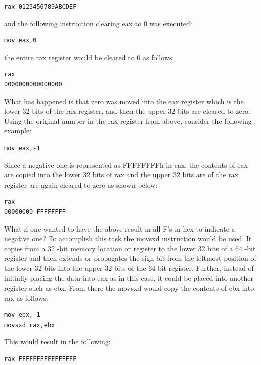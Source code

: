 \documentclass[10pt]{book}
\begin{document}
\begin{verbatim}
rax 0123456789ABCDEF
\end{verbatim}

and the following instruction clearing eax to 0 was executed:

\begin{verbatim}
mov eax,0
\end{verbatim}

the entire rax register would be cleared to 0 as follows:

\begin{verbatim}
rax
0000000000000000
\end{verbatim}

What has happened is that zero was moved into the eax register which is the lower 32 bits of the rax register, and then the upper 32 bits are cleared to zero. Using the original number in the rax register from above, consider the following example:

\begin{verbatim}
mov eax,-1
\end{verbatim}

Since a negative one is represented as FFFFFFFFh in eax, the contents of eax are copied into the lower 32 bits of rax and the upper 32 bits are of the rax register are again cleared to zero as shown below:

\begin{verbatim}
rax
00000000 FFFFFFFF
\end{verbatim}

What if one wanted to have the above result in all F's in hex to indicate a negative one? To accomplish this task the movsxd instruction would be used. It copies from a 32 -bit memory location or register to the lower 32 bits of a 64 -bit register and then extends or propagates the sign-bit from the leftmost position of the lower 32 bits into the upper 32 bits of the 64-bit register. Further, instead of initially placing the data into eax as in this case, it could be placed into another register such as ebx. From there the movsxd would copy the contents of ebx into rax as follows:

\begin{verbatim}
mov ebx,-1
movsxd rax,ebx
\end{verbatim}

This would result in the following:

\begin{verbatim}
rax FFFFFFFFFFFFFFFF
\end{verbatim}
\end{document}
